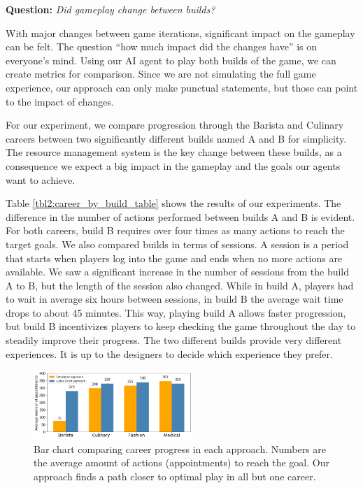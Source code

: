 \documentclass[letterpaper]{article} %
\begin{document}
\textbf{Question:} {\em Did gameplay change between builds?}

With major changes between game iterations, significant impact on the gameplay can be felt. The question ``how much impact did the changes have'' is on everyone's mind. Using our AI agent to play both builds of the game, we can create metrics for comparison. Since we are not simulating the full game experience, our approach can only make punctual statements, but those can point to the impact of changes.

For our experiment, we compare progression through the Barista and Culinary careers between two significantly different builds named A and B for simplicity. The resource management system is the key change between these builds, as a consequence we expect a big impact in the gameplay and the goals our agents want to achieve.


Table \ref{tbl2:career_by_build_table} shows the results of our experiments. The difference in the number of actions performed between builds A and B is evident. For both careers, build B requires over four times as many actions to reach the target goals. We also compared builds in terms of sessions. A session is a period that starts when players log into the game and ends when no more actions are available. We saw a significant increase in the number of sessions from the build A to B, but the length of the session also changed. While in build A, players had to wait in average six hours between sessions, in build B the average wait time drops to about 45 minutes. This way, playing build A allows faster progression, but build B incentivizes players to keep checking the game throughout the day to steadily improve their progress. The two different builds provide very different experiences. It is up to the designers to decide which experience they prefer.


\begin{figure}[t]
\centering
\includegraphics[width=0.7200000000000001\linewidth,height=1.02in ]{images/career_approach_comparison.png}
\caption{Bar chart comparing career progress in each approach. Numbers are the average amount of actions (appointments) to reach the goal. Our approach finds a path closer to optimal play in all but one career.}
\label{Figure:career_approach_comp}
\end{figure}
\end{document}

